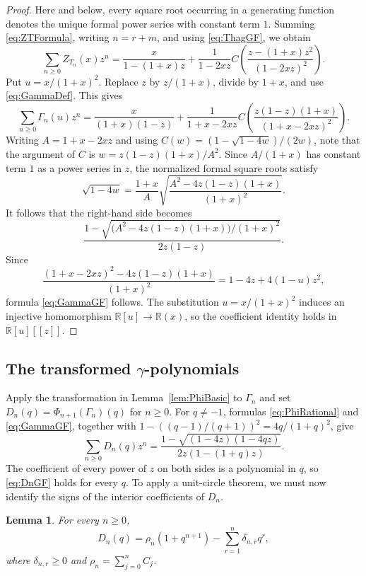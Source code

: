 \documentclass[11pt]{article}
\theoremstyle{plain}
\newtheorem{lemma}[theorem]{Lemma}
\theoremstyle{remark}
\begin{document}
\begin{proof}
Here and below, every square root occurring in a generating function
denotes the unique formal power series with constant term $1$.
Summing \eqref{eq:ZTFormula}, writing $n=r+m$, and using
\eqref{eq:ThagGF}, we obtain
\[
\sum_{n\ge0}Z_{T_n}(x)z^n
=\frac{x}{1-(1+x)z}
+\frac{1}{1-2xz}
C\!\left(\frac{z-(1+x)z^2}{(1-2xz)^2}\right).
\]
Put $u=x/(1+x)^2$.  Replace $z$ by $z/(1+x)$, divide by $1+x$, and
use \eqref{eq:GammaDef}.  This gives
\[
\sum_{n\ge0}\Gamma_n(u)z^n
=\frac{x}{(1+x)(1-z)}
+\frac{1}{1+x-2xz}
C\!\left(\frac{z(1-z)(1+x)}{(1+x-2xz)^2}\right).
\]
Writing $A=1+x-2xz$ and using
$C(w)=(1-\sqrt{1-4w})/(2w)$, note that the argument of $C$ is
$w=z(1-z)(1+x)/A^2$.  Since $A/(1+x)$ has constant term $1$ as a
power series in $z$, the normalized formal square roots satisfy
\[
\sqrt{1-4w}
=\frac{1+x}{A}
\sqrt{\frac{A^2-4z(1-z)(1+x)}{(1+x)^2}}.
\]
It follows that the right-hand side becomes
\[
\frac{1-
\sqrt{\bigl(A^2-4z(1-z)(1+x)\bigr)/(1+x)^2}}
{2z(1-z)}.
\]
Since
\[
\frac{(1+x-2xz)^2-4z(1-z)(1+x)}{(1+x)^2}
=1-4z+4(1-u)z^2,
\]
formula \eqref{eq:GammaGF} follows.  The substitution
$u=x/(1+x)^2$ induces an injective homomorphism
$\mathbb R[u]\to\mathbb R(x)$, so the coefficient identity holds in
$\mathbb R[u][[z]]$.
\end{proof}

\subsection{The transformed \texorpdfstring{$\gamma$}{gamma}-polynomials}

Apply the transformation in Lemma~\ref{lem:PhiBasic} to
$\Gamma_n$ and set $D_n(q)=\Phi_{n+1}(\Gamma_n)(q)$ for $n\ge0$.
For $q\ne-1$, formulas \eqref{eq:PhiRational} and
\eqref{eq:GammaGF}, together with
$1-((q-1)/(q+1))^2=4q/(1+q)^2$, give
\begin{equation}\label{eq:DnGF}
\sum_{n\ge0}D_n(q)z^n
=\frac{1-\sqrt{(1-4z)(1-4qz)}}
{2z(1-(1+q)z)}.
\end{equation}
The coefficient of every power of $z$ on both sides is a polynomial
in $q$, so \eqref{eq:DnGF} holds for every $q$.  To apply a
unit-circle theorem, we must now identify the signs of the interior
coefficients of $D_n$.

\begin{lemma}\label{lem:DnCoeffSign}
For every $n\ge0$,
\begin{equation}\label{eq:DnCoeffShape}
D_n(q)=\rho_n(1+q^{n+1})-
\sum_{r=1}^n\delta_{n,r}q^r,
\end{equation}
where $\delta_{n,r}\ge0$ and
$\rho_n=\sum_{j=0}^nC_j$.
\end{lemma}
\end{document}

